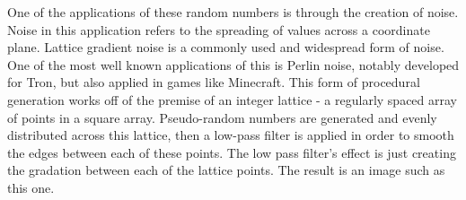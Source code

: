 \documentclass[10pt]{report}
\begin{document}
		One of the applications of these random numbers is through the creation of noise. Noise in this application refers to the spreading of values across a coordinate plane. Lattice gradient noise is a commonly used and widespread form of noise. One of the most well known applications of this is Perlin noise, notably developed for Tron, but also applied in games like Minecraft. This form of procedural generation works off of the premise of an integer lattice - a regularly spaced array of points in a square array. Pseudo-random numbers are generated and evenly distributed across this lattice, then a low-pass filter is applied in order to smooth the edges between each of these points. The low pass filter's effect is just creating the gradation between each of the lattice points. The result is an image such as this one.
\end{document}
